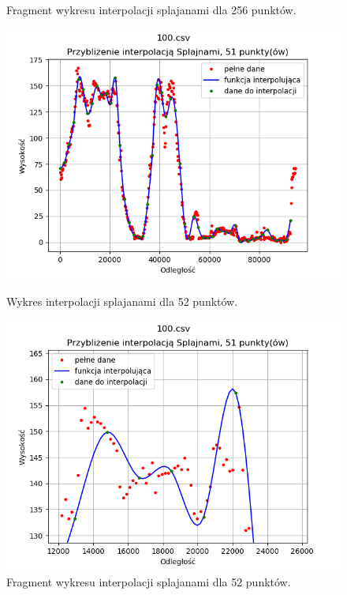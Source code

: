 \documentclass{article} %
\begin{document}
\begin{figure}[h!]
\begin{minipage}[b]{0.4\textwidth}
        \caption{Fragment wykresu interpolacji splajanami dla 256 punktów.}
    \end{minipage}
    \begin{minipage}[b]{0.4\textwidth}
        \includegraphics[width=\textwidth]{splajny/rozne_dokladnosci/100_52punkty_cale.png}
        \caption{Wykres interpolacji splajanami dla 52 punktów.}
    \end{minipage}
    \hfill
    \begin{minipage}[b]{0.4\textwidth}
        \includegraphics[width=\textwidth]{splajny/rozne_dokladnosci/100_52punkty_zblizenie.png}
        \caption{Fragment wykresu interpolacji splajanami dla 52 punktów.}
    \end{minipage}
\end{figure}
\end{document}
